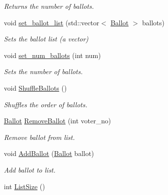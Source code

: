 \begin{DoxyCompactItemize}
\begin{DoxyCompactList}\small\item\em Returns the number of ballots. \end{DoxyCompactList}\item 
void \hyperlink{class_ballot_list_aff8ea545ef67d60287aa543af731b331}{set\+\_\+ballot\+\_\+list} (std\+::vector$<$ \hyperlink{class_ballot}{Ballot} $>$ ballots)
\begin{DoxyCompactList}\small\item\em Sets the ballot list (a vector) \end{DoxyCompactList}\item 
void \hyperlink{class_ballot_list_abc969edf27fe35f064322fb02e1180a9}{set\+\_\+num\+\_\+ballots} (int num)
\begin{DoxyCompactList}\small\item\em Sets the number of ballots. \end{DoxyCompactList}\item 
void \hyperlink{class_ballot_list_a087bcfd1a8849e23381896ce951d0053}{Shuffle\+Ballots} ()\hypertarget{class_ballot_list_a087bcfd1a8849e23381896ce951d0053}{}\label{class_ballot_list_a087bcfd1a8849e23381896ce951d0053}

\begin{DoxyCompactList}\small\item\em Shuffles the order of ballots. \end{DoxyCompactList}\item 
\hyperlink{class_ballot}{Ballot} \hyperlink{class_ballot_list_a1d77010372fbcbf06a87028f6862f58c}{Remove\+Ballot} (int voter\+\_\+no)
\begin{DoxyCompactList}\small\item\em Remove ballot from list. \end{DoxyCompactList}\item 
void \hyperlink{class_ballot_list_a19237ad76f1a257ef200cec65a52471a}{Add\+Ballot} (\hyperlink{class_ballot}{Ballot} ballot)
\begin{DoxyCompactList}\small\item\em Add ballot to list. \end{DoxyCompactList}\item 
int \hyperlink{class_ballot_list_acfe06cc28afdc840e73e59acc301bc97}{List\+Size} ()\hypertarget{class_ballot_list_acfe06cc28afdc840e73e59acc301bc97}{}\label{class_ballot_list_acfe06cc28afdc840e73e59acc301bc97}


\end{DoxyCompactItemize}
